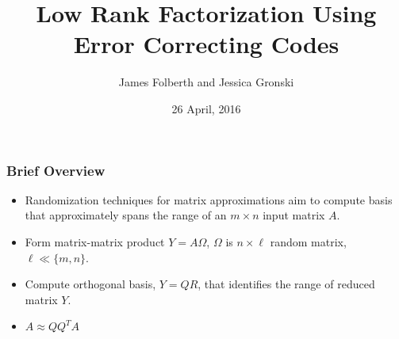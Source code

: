 \documentclass[9pt]{beamer}
\begin{document}
\title{Low Rank Factorization Using Error Correcting Codes}
\author[]{James Folberth and Jessica Gronski }
\date{26 April, 2016}

\begin{frame}
\titlepage
\end{frame}

\begin{frame}
\frametitle{Brief Overview}
\begin{itemize}
\item Randomization techniques for matrix approximations aim to compute basis that approximately spans the range of an $ m \times n$ input matrix $A$.
\vspace{4mm}

\item Form matrix-matrix product $Y = A \Omega$, $\Omega$ is $n \times \ell$ random matrix, $\ell \ll \{m,n\}$.
\vspace{4mm}

\item Compute orthogonal basis, $Y = QR$, that identifies the range of reduced matrix $Y$.
\vspace{4mm}

\item $A \approx QQ^T A$

\end{itemize}
\end{frame}
\end{document}
